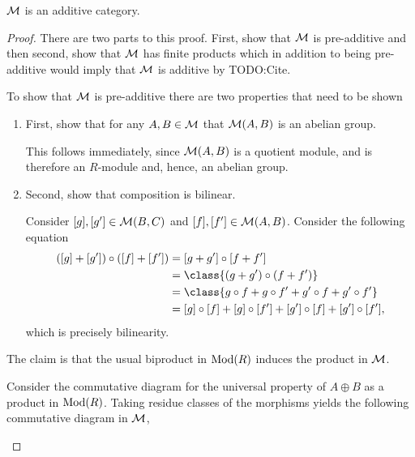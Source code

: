 \begin{lemma}
    \( {\mathcal{M}} \) is an additive category.
\end{lemma}
\begin{proof}
    There are two parts to this proof. First, show that \( {\mathcal{M}} \) is pre-additive and then second, show that \( {\mathcal{M}} \) has finite products which in addition to being pre-additive would imply that \( {\mathcal{M}} \) is additive by TODO:Cite.

    To show that \( {\mathcal{M}} \) is pre-additive there are two properties that need to be shown
    \begin{enumerate}
        \item {
            First, show that for any \( A, B \in {\mathcal{M}} \) that \( {\mathcal{M}}(A, B) \) is an abelian group.

            This follows immediately, since \( {\mathcal{M}}(A, B) \) is a quotient module, and is therefore an \( R \)-module and, hence, an abelian group.
        }
        \item {
            Second, show that composition is bilinear.

            Consider \( [g], [g'] \in {\mathcal{M}}(B, C) \) and \( [f], [f'] \in {\mathcal{M}}(A, B) \). Consider the following equation
            \begin{align*}
                ([g] + [g']) \circ ([f] + [f']) &= [g + g'] \circ [f + f'] \\
                &= \class{(g + g') \circ (f + f')} \\
                &= \class{g \circ f + g \circ f' + g' \circ f + g' \circ f'} \\
                &= [g] \circ [f] + [g] \circ [f'] + [g'] \circ [f] + [g'] \circ [f'],
            \end{align*}
            which is precisely bilinearity.
        }
    \end{enumerate}

    The claim is that the usual biproduct in \( \operatorname{Mod}(R) \) induces the product in \( {\mathcal{M}} \).
    
    Consider the commutative diagram for the universal property of \( A \oplus B \) as a product in \( \operatorname{Mod}(R) \). Taking residue classes of the morphisms yields the following commutative diagram in \( {\mathcal{M}} \),
    \begin{center}
\end{center}
\end{proof}
